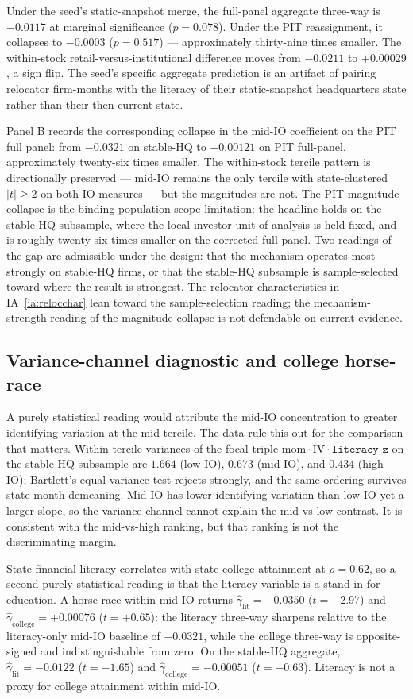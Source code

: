 Under the seed's static-snapshot merge, the full-panel aggregate three-way is $-0.0117$ at marginal significance ($p = 0.078$). Under the PIT reassignment, it collapses to $-0.0003$ ($p = 0.517$) --- approximately thirty-nine times smaller. The within-stock retail-versus-institutional difference moves from $-0.0211$ to $+0.00029$, a sign flip. The seed's specific aggregate prediction is an artifact of pairing relocator firm-months with the literacy of their static-snapshot headquarters state rather than their then-current state.

Panel B records the corresponding collapse in the mid-IO coefficient on the PIT full panel: from $-0.0321$ on stable-HQ to $-0.00121$ on PIT full-panel, approximately twenty-six times smaller. The within-stock tercile pattern is directionally preserved --- mid-IO remains the only tercile with state-clustered $|t| \geq 2$ on both IO measures --- but the magnitudes are not. The PIT magnitude collapse is the binding population-scope limitation: the headline holds on the stable-HQ subsample, where the local-investor unit of analysis is held fixed, and is roughly twenty-six times smaller on the corrected full panel. Two readings of the gap are admissible under the design: that the mechanism operates most strongly on stable-HQ firms, or that the stable-HQ subsample is sample-selected toward where the result is strongest. The relocator characteristics in IA~\ref{ia:relocchar} lean toward the sample-selection reading; the mechanism-strength reading of the magnitude collapse is not defendable on current evidence.

\subsection{Variance-channel diagnostic and college horse-race}
\label{sec:variance}
\label{sec:college}

A purely statistical reading would attribute the mid-IO concentration to greater identifying variation at the mid tercile. The data rule this out for the comparison that matters. Within-tercile variances of the focal triple $\mathrm{mom}\cdot\mathrm{IV}\cdot\mathtt{literacy\_z}$ on the stable-HQ subsample are $1.664$ (low-IO), $0.673$ (mid-IO), and $0.434$ (high-IO); Bartlett's equal-variance test rejects strongly, and the same ordering survives state-month demeaning. Mid-IO has lower identifying variation than low-IO yet a larger slope, so the variance channel cannot explain the mid-vs-low contrast. It is consistent with the mid-vs-high ranking, but that ranking is not the discriminating margin.

State financial literacy correlates with state college attainment at $\rho = 0.62$, so a second purely statistical reading is that the literacy variable is a stand-in for education. A horse-race within mid-IO returns $\hat\gamma_{\text{lit}} = -0.0350$ ($t = -2.97$) and $\hat\gamma_{\text{college}} = +0.00076$ ($t = +0.65$): the literacy three-way sharpens relative to the literacy-only mid-IO baseline of $-0.0321$, while the college three-way is opposite-signed and indistinguishable from zero. On the stable-HQ aggregate, $\hat\gamma_{\text{lit}} = -0.0122$ ($t = -1.65$) and $\hat\gamma_{\text{college}} = -0.00051$ ($t = -0.63$). Literacy is not a proxy for college attainment within mid-IO.
